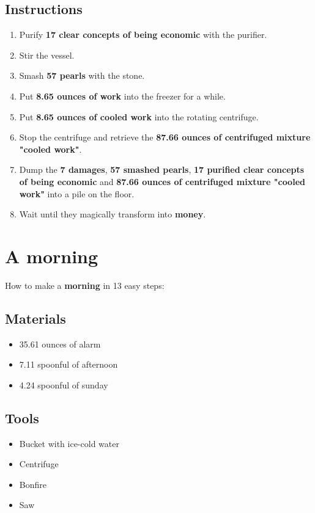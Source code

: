 \documentclass{article}
\begin{document}
\subsection{Instructions}\begin{enumerate}
\item 
Purify \textbf{17 clear concepts of being economic} with the purifier.
\item 
Stir the vessel.
\item 
Smash \textbf{57 pearls} with the stone.
\item 
Put \textbf{8.65 ounces of work} into the freezer for a while.
\item 
Put \textbf{8.65 ounces of cooled work} into the rotating centrifuge.
\item 
Stop the centrifuge and retrieve the \textbf{87.66 ounces of centrifuged mixture "cooled work"}.
\item 
Dump the \textbf{7 damages}, \textbf{57 smashed pearls}, \textbf{17 purified clear concepts of being economic} and \textbf{87.66 ounces of centrifuged mixture "cooled work"} into a pile on the floor.
\item 
Wait until they magically transform into \textbf{money}.
\end{enumerate}
\newpage
\section{A morning}How to make a \textbf{morning} in 13 easy steps:

\subsection{Materials}\begin{itemize}
\item 
35.61 ounces of alarm
\item 
7.11 spoonful of afternoon
\item 
4.24 spoonful of sunday
\end{itemize}
\subsection{Tools}\begin{itemize}
\item 
Bucket with ice-cold water
\item 
Centrifuge
\item 
Bonfire
\item 
Saw
\end{itemize}
\end{document}

